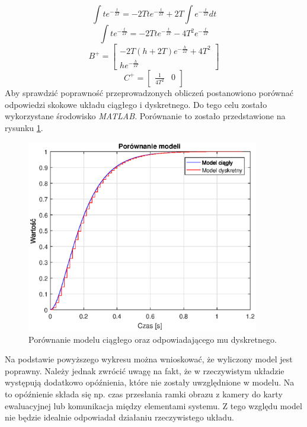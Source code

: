 \begin{equation}
\int te^{-\frac{t}{2T}}=-2Tte^{-\frac{t}{2T}}+2T\int e^{-\frac{t}{2T}}dt
\end{equation}
\begin{equation}
\int te^{-\frac{t}{2T}}=-2Tte^{-\frac{t}{2T}}-4T^2e^{-\frac{t}{2T}}
\end{equation}
\begin{equation}
B^+=
	\begin{bmatrix}
	-2T(h+2T)e^{-\frac{h}{2T}}+4T^2 \\
	he^{-\frac{h}{2T}}
	\end{bmatrix}
\end{equation}
\begin{equation}
C^+=
	\begin{bmatrix}
	\frac{1}{4T^2} & 0
	\end{bmatrix}
\end{equation}
Aby sprawdzić poprawność przeprowadzonych obliczeń postanowiono porównać odpowiedzi skokowe układu ciągłego i dyskretnego. Do tego celu zostało wykorzystane środowisko \textit{MATLAB}. Porównanie to zostało przedstawione na rysunku \ref{fig:comp}.

\begin{figure}[h]
	\centering
	\includegraphics[width=4in]{comp.eps}
	\caption{Porównanie modelu ciągłego oraz odpowiadającego mu dyskretnego.}
	\label{fig:comp}
\end{figure}

Na podstawie powyższego wykresu można wnioskować, że wyliczony model jest poprawny.
Należy jednak zwrócić uwagę na fakt, że w rzeczywistym układzie występują dodatkowo opóźnienia, które nie zostały uwzględnione w modelu.
Na to opóźnienie składa się np. czas przesłania ramki obrazu z kamery do karty ewaluacyjnej lub komunikacja między elementami systemu.
Z tego względu model nie będzie idealnie odpowiadał działaniu rzeczywistego układu.

